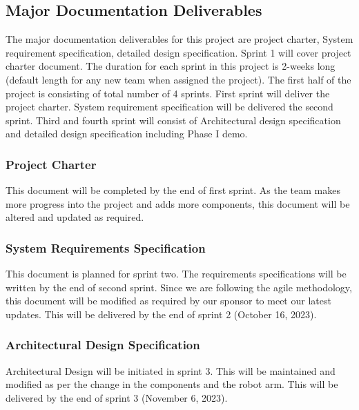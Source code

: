 
\subsection{Major Documentation Deliverables}
The major documentation deliverables for this project are project charter, System requirement specification, detailed design specification. Sprint 1 will cover project charter document. The duration for each sprint in this project is 2-weeks long (default length for any new team when assigned the project). The first half of the project is consisting of total number of 4 sprints. First sprint will deliver the project charter. System requirement specification will be delivered the second sprint. Third and fourth sprint will consist of Architectural design specification and detailed design specification including Phase I demo. 

\subsubsection{Project Charter}
This document will be completed by the end of first sprint. As the team makes more progress into the project and adds more components, this document will be altered and updated as required.


\subsubsection{System Requirements Specification}
This document is planned for sprint two. The requirements specifications will be written by the end of second sprint. Since we are following the agile methodology, this document will be modified as required by our sponsor to meet our latest updates. This will be delivered by the end of sprint 2 (October 16, 2023). 

\subsubsection{Architectural Design Specification}
Architectural Design will be initiated in sprint 3. This will be maintained and modified as per the change in the components and the robot arm. This will be delivered by the end of sprint 3 (November 6, 2023). 

